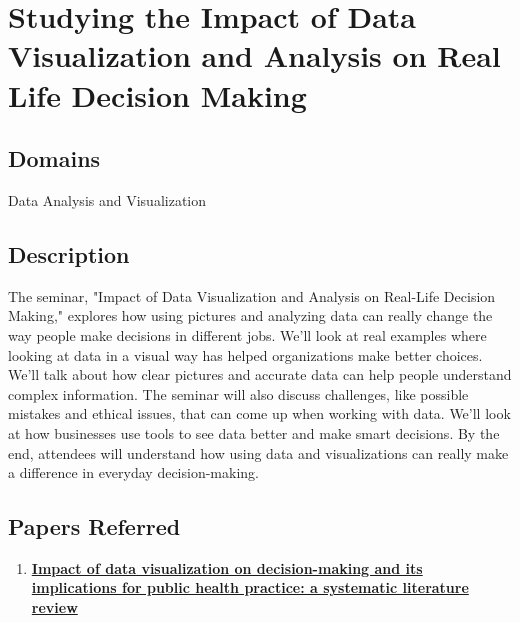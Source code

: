 \documentclass[11pt]{article}
\begin{document}
\section{Studying the Impact of Data Visualization and Analysis on Real Life Decision Making }
\subsection{Domains}
Data Analysis and Visualization
\subsection{Description}

The seminar, "Impact of Data Visualization and Analysis on Real-Life Decision Making," explores how using pictures and analyzing data can really change the way people make decisions in different jobs. We'll look at real examples where looking at data in a visual way has helped organizations make better choices. We'll talk about how clear pictures and accurate data can help people understand complex information. The seminar will also discuss challenges, like possible mistakes and ethical issues, that can come up when working with data. We'll look at how businesses use tools to see data better and make smart decisions. By the end, attendees will understand how using data and visualizations can really make a difference in everyday decision-making.


\subsection{Papers Referred}
\begin{enumerate}
    \item \href{https://www.tandfonline.com/doi/abs/10.1080/17538157.2021.1982949}{\textbf{Impact of data visualization on decision-making and its implications for public health practice: a systematic literature review}}
\end{enumerate}

\clearpage

\pagebreak
\end{document}
